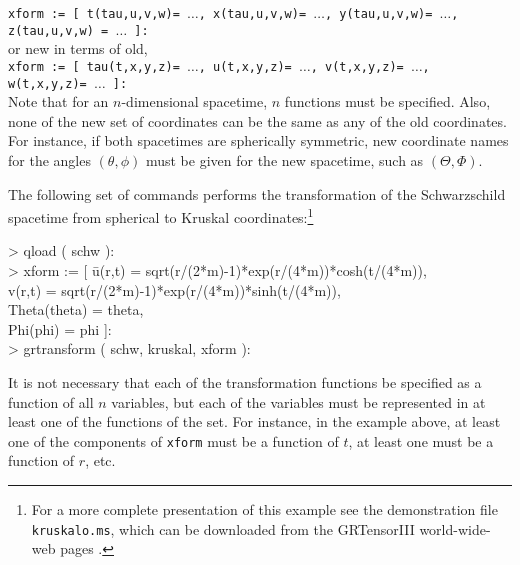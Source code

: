 \documentclass{article}
\begin{document}
\noindent\texttt{xform := [ t(tau,u,v,w)= $\ldots$, x(tau,u,v,w)= $\ldots$,
  y(tau,u,v,w)= $\ldots$, z(tau,u,v,w) = $\ldots$ ]:}\\

\noindent or new in terms of old,\\

\noindent\texttt{xform := [ tau(t,x,y,z)= $\ldots$, u(t,x,y,z)= $\ldots$,
  v(t,x,y,z)= $\ldots$, w(t,x,y,z)= $\ldots$ ]:}\\

\noindent Note that for an $n$-dimensional spacetime, $n$ functions must be 
specified.  Also, none of the new set of coordinates can be the same
as any of the old coordinates. For instance, if both spacetimes are
spherically symmetric, new coordinate names for the angles
$( \theta, \phi )$ must be given for the new spacetime, such as
$( \Theta, \Phi )$.

The following set of commands performs the transformation of the Schwarzschild
spacetime from spherical to Kruskal coordinates:\footnote{For a more complete
presentation of this example see the demonstration file \texttt{kruskalo.ms},
which can be downloaded from the GRTensorIII world-wide-web pages \cite{www}.}

\begin{ttfamily}
  \begin{tabbing}
    >  qload ( schw ):\vspace{\baselineskip}\\

    >  xform := [ \= u(r,t) = sqrt(r/(2*m)-1)*exp(r/(4*m))*cosh(t/(4*m)),\\
              \>  v(r,t) = sqrt(r/(2*m)-1)*exp(r/(4*m))*sinh(t/(4*m)),\\
              \>  Theta(theta) = theta,\\
              \>  Phi(phi) = phi ]:\\

    >  grtransform ( schw, kruskal, xform ):
  \end{tabbing}
\end{ttfamily}

It is not necessary that each of the transformation functions be specified 
as a function of all $n$ variables, but each of the variables must be
represented in at least one of the functions of the set. For instance,
in the example above, at least one of the components of \texttt{xform}
must be a function of $t$, at least one must be a function of $r$, etc.
\end{document}
